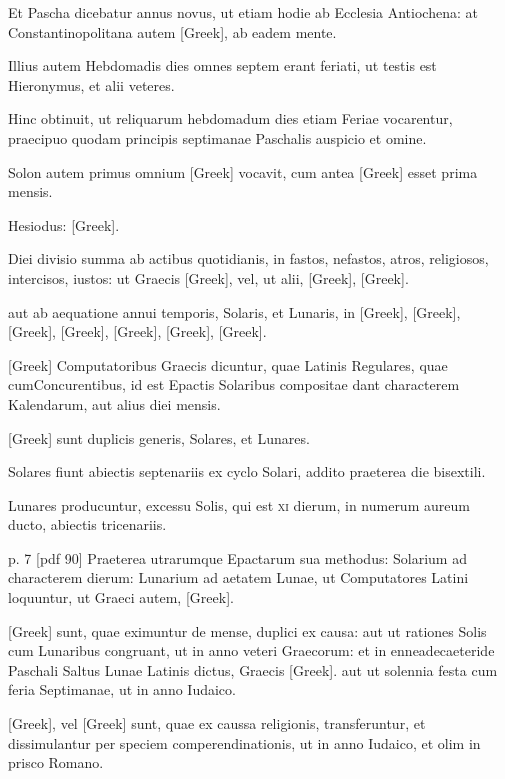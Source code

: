Et Pascha dicebatur annus novus, ut etiam hodie ab Ecclesia
Antiochena: at Constantinopolitana autem \textgreek{[Greek]},
ab eadem mente.

Illius autem Hebdomadis dies omnes septem erant
feriati, ut testis est Hieronymus, et alii veteres.

Hinc obtinuit, ut reliquarum
hebdomadum dies etiam Feriae vocarentur, praecipuo quodam
principis septimanae Paschalis auspicio et omine.

Solon autem
primus omnium \textgreek{[Greek]} vocavit, cum antea \textgreek{[Greek]} esset
prima mensis.

Hesiodus: \textgreek{[Greek]}.

Diei divisio summa ab actibus quotidianis, in fastos, nefastos, atros,
religiosos, intercisos, iustos: ut Graecis \textgreek{[Greek]}, vel, ut alii,
\textgreek{[Greek]}, \textgreek{[Greek]}.

aut ab aequatione annui
temporis, Solaris, et Lunaris, in \textgreek{[Greek]}, \textgreek{[Greek]},
\textgreek{[Greek]}, \textgreek{[Greek]}, \textgreek{[Greek]},
\textgreek{[Greek]}, \textgreek{[Greek]}.

\textgreek{[Greek]} Computatoribus
Graecis dicuntur, quae Latinis Regulares, quae cumConcurentibus,
id est Epactis Solaribus compositae dant characterem Kalendarum,
aut alius diei mensis.

\textgreek{[Greek]} sunt duplicis generis, Solares, et
Lunares.

Solares fiunt abiectis septenariis ex cyclo Solari, addito praeterea
die bisextili.

Lunares producuntur, excessu Solis, qui est \textsc{xi} dierum,
in numerum aureum ducto, abiectis tricenariis.

p. 7 [pdf 90]
%
Praeterea utrarumque
Epactarum sua methodus: Solarium ad characterem dierum:
Lunarium ad aetatem Lunae, ut Computatores Latini loquuntur, ut
Graeci autem, \textgreek{[Greek]}.

\textgreek{[Greek]} sunt, quae eximuntur de
mense, duplici ex causa: aut ut rationes Solis cum Lunaribus congruant,
ut in anno veteri Graecorum: et in enneadecaeteride Paschali
Saltus Lunae Latinis dictus, Graecis \textgreek{[Greek]}. aut ut solennia
festa cum feria Septimanae, ut in anno Iudaico.

\textgreek{[Greek]}, vel \textgreek{[Greek]}
sunt, quae ex caussa religionis, transferuntur, et dissimulantur per speciem
comperendinationis, ut in anno Iudaico, et olim in prisco Romano.

